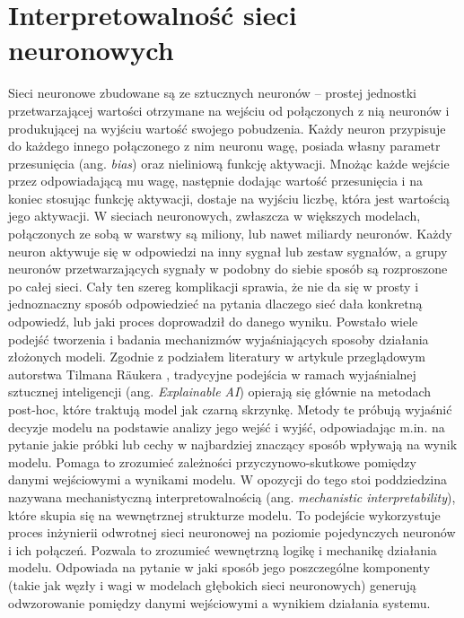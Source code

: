 \section{Interpretowalność sieci neuronowych}
\label{sec:interpretowalnosc_sieci_neuronowych}
Sieci neuronowe zbudowane są ze sztucznych neuronów -- prostej jednostki przetwarzającej wartości otrzymane na wejściu od połączonych z nią neuronów i produkującej na wyjściu wartość swojego pobudzenia. Każdy neuron przypisuje do każdego innego połączonego z nim neuronu wagę, posiada własny parametr przesunięcia (ang. \textit{bias}) oraz nieliniową funkcję aktywacji. Mnożąc każde wejście przez odpowiadającą mu wagę, następnie dodając wartość przesunięcia i na koniec stosując funkcję aktywacji, dostaje na wyjściu liczbę, która jest wartością jego aktywacji. W sieciach neuronowych, zwłaszcza w większych modelach, połączonych ze sobą w warstwy są miliony, lub nawet miliardy neuronów. Każdy neuron aktywuje się w odpowiedzi na inny sygnał lub zestaw sygnałów, a grupy neuronów przetwarzających sygnały w podobny do siebie sposób są rozproszone po całej sieci. Cały ten szereg komplikacji sprawia, że nie da się w prosty i jednoznaczny sposób odpowiedzieć na pytania dlaczego sieć dała konkretną odpowiedź, lub jaki proces doprowadził do danego wyniku. \newline
Powstało wiele podejść tworzenia i badania mechanizmów wyjaśniających sposoby działania złożonych modeli. Zgodnie z podziałem literatury w artykule przeglądowym autorstwa Tilmana Räukera \cite{rauker_toward_transparent_ai}, tradycyjne podejścia w ramach wyjaśnialnej sztucznej inteligencji (ang. \textit{Explainable AI}) opierają się głównie na metodach post-hoc, które traktują model jak czarną skrzynkę. Metody te próbują wyjaśnić decyzje modelu na podstawie analizy jego wejść i wyjść, odpowiadając m.in. na pytanie jakie próbki lub cechy w najbardziej znaczący sposób wpływają na wynik modelu. Pomaga to zrozumieć zależności przyczynowo-skutkowe pomiędzy danymi wejściowymi a wynikami modelu. W opozycji do tego stoi poddziedzina nazywana mechanistyczną interpretowalnością (ang. \textit{mechanistic interpretability}), które skupia się na wewnętrznej strukturze modelu. To podejście wykorzystuje proces inżynierii odwrotnej sieci neuronowej na poziomie pojedynczych neuronów i ich połączeń. Pozwala to zrozumieć wewnętrzną logikę i mechanikę działania modelu. Odpowiada na pytanie w jaki sposób jego poszczególne komponenty (takie jak węzły i wagi w modelach głębokich sieci neuronowych) generują odwzorowanie pomiędzy danymi wejściowymi a wynikiem działania systemu. \newline
